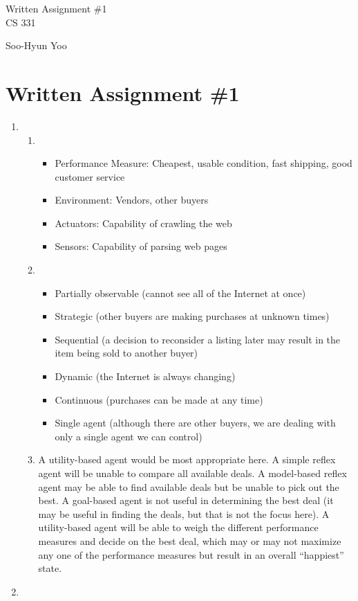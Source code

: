 \documentclass[10pt,letterpaper]{article}
\begin{document}
\begin{titlepage}
	\vspace*{4cm}
	\begin{flushright}
	{\huge
		Written Assignment \#1 \\ [3cm]
	}
	{\large
		CS 331
	}
	\end{flushright}

	\begin{flushright}
	Soo-Hyun Yoo
	\end{flushright}
\end{titlepage}

\section*{Written Assignment \#1}

\begin{enumerate}
	\item
		\begin{enumerate}
			\item
				\begin{itemize}
					\item Performance Measure: Cheapest, usable condition, fast
						shipping, good customer service
					\item Environment: Vendors, other buyers
					\item Actuators: Capability of crawling the web
					\item Sensors: Capability of parsing web pages
				\end{itemize}
			\item
				\begin{itemize}
					\item Partially observable (cannot see all of the Internet
						at once)
					\item Strategic (other buyers are making purchases at
						unknown times)
					\item Sequential (a decision to reconsider a listing later
						may result in the item being sold to another buyer)
					\item Dynamic (the Internet is always changing)
					\item Continuous (purchases can be made at any time)
					\item Single agent (although there are other buyers, we are
						dealing with only a single agent we can control)
				\end{itemize}
			\item A utility-based agent would be most appropriate here.
				A simple reflex agent will be unable to compare all available
				deals. A model-based reflex agent may be able to find available
				deals but be unable to pick out the best. A goal-based agent is
				not useful in determining the best deal (it may be useful in
				finding the deals, but that is not the focus here).
				A utility-based agent will be able to weigh the different
				performance measures and decide on the best deal, which may or
				may not maximize any one of the performance measures but result
				in an overall ``happiest'' state.
		\end{enumerate}
	\item 

\end{enumerate}
\end{document}

